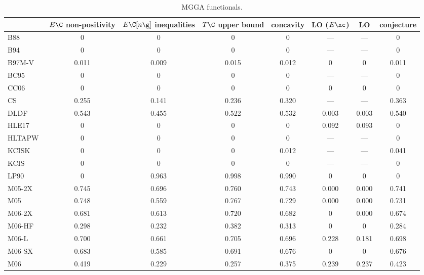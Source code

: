\begin{table}
\caption{MGGA functionals.}
\begin{tabular}{|l|c|c|c|c|c|c|c|}
\toprule
 & $E\C$ non-positivity & $E\C[n\g]$ inequalities & $T\C$ upper bound & concavity & LO ($E\xc$) & LO & conjecture \\
\midrule
B88~\cite{Becke1988_1053} & 0 & 0 & 0 & 0 & --- & --- & 0 \\
B94~\cite{Becke1994_625} & 0 & 0 & 0 & 0 & --- & --- & 0 \\
B97M-V~\cite{Mardirossian2015_074111} & 0.011 & 0.009 & 0.015 & 0.012 & 0 & 0 & 0.011 \\
BC95~\cite{Becke1996_1040} & 0 & 0 & 0 & 0 & --- & --- & 0 \\
CC06~\cite{Cancio2006_081202} & 0 & 0 & 0 & 0 & 0 & 0 & 0 \\
CS~\cite{Colle1975_329,Lee1988_785} & 0.255 & 0.141 & 0.236 & 0.320 & --- & --- & 0.363 \\
DLDF~\cite{Pernal2009_263201} & 0.543 & 0.455 & 0.522 & 0.532 & 0.003 & 0.003 & 0.540 \\
HLE17~\cite{Verma2017_7144} & 0 & 0 & 0 & 0 & 0.092 & 0.093 & 0 \\
HLTAPW~\cite{Lehtola2021_943} & 0 & 0 & 0 & 0 & --- & --- & 0 \\
KCISK~\cite{Rey1998_581,Krieger1999_463,Krieger2001_48,Kurth1999_889,Toulouse2002_10465} & 0 & 0 & 0 & 0.012 & --- & --- & 0.041 \\
KCIS~\cite{Rey1998_581,Krieger1999_463,Krieger2001_48,Kurth1999_889,Toulouse2002_10465} & 0 & 0 & 0 & 0 & --- & --- & 0 \\
LP90~\cite{Lee1990_193} & 0 & 0.963 & 0.998 & 0.990 & 0 & 0 & 0 \\
M05-2X~\cite{Zhao2006_364} & 0.745 & 0.696 & 0.760 & 0.743 & 0.000 & 0.000 & 0.741 \\
M05~\cite{Zhao2005_161103} & 0.748 & 0.559 & 0.767 & 0.729 & 0.000 & 0.000 & 0.731 \\
M06-2X~\cite{Zhao2008_215} & 0.681 & 0.613 & 0.720 & 0.682 & 0 & 0.000 & 0.674 \\
M06-HF~\cite{Zhao2006_13126} & 0.298 & 0.232 & 0.382 & 0.313 & 0 & 0 & 0.284 \\
M06-L~\cite{Zhao2006_194101,Zhao2008_215} & 0.700 & 0.661 & 0.705 & 0.696 & 0.228 & 0.181 & 0.698 \\
M06-SX~\cite{Wang2020_2294} & 0.683 & 0.585 & 0.691 & 0.676 & 0 & 0 & 0.676 \\
M06~\cite{Zhao2008_215} & 0.419 & 0.229 & 0.257 & 0.375 & 0.239 & 0.237 & 0.423 \\

\end{tabular}
\end{table}
